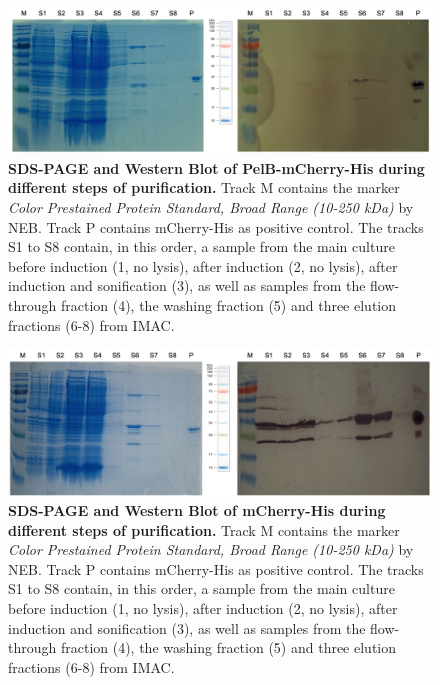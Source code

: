 \documentclass[a4paper,12pt]{article}
\begin{document}
\begin{figure}[h!]
    \centering
    \includegraphics[width=\textwidth]{images/sds_western_blot.png}
    \caption{\textbf{SDS-PAGE and Western Blot of PelB-mCherry-His during different steps of purification.} Track M contains the marker \emph{Color Prestained Protein Standard, Broad Range (10-250 kDa)} by NEB. Track P contains mCherry-His as positive control. The tracks S1 to S8 contain, in this order, a sample from the main culture before induction (1, no lysis), after induction (2, no lysis), after induction and sonification (3), as well as samples from the flow-through fraction (4), the washing fraction  (5) and three elution fractions (6-8) from IMAC. }
    \label{fig:sds_pelB}
\end{figure}

\begin{figure}[h!]
    \centering
    \includegraphics[width=\textwidth]{images/group6_sds_western.png}
    \caption{\textbf{SDS-PAGE and Western Blot of mCherry-His during different steps of purification.} Track M contains the marker \emph{Color Prestained Protein Standard, Broad Range (10-250 kDa)} by NEB. Track P contains mCherry-His as positive control. The tracks S1 to S8 contain, in this order, a sample from the main culture before induction (1, no lysis), after induction (2, no lysis), after induction and sonification (3), as well as samples from the flow-through fraction (4), the washing fraction  (5) and three elution fractions (6-8) from IMAC. }
    \label{fig:sds_non_pelB}
\end{figure}
\end{document}

